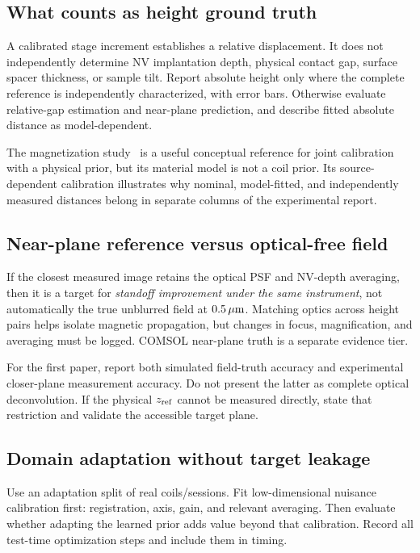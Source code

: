 \subsection{What counts as height ground truth}
A calibrated stage increment establishes a relative displacement. It does not independently determine NV implantation depth, physical contact gap, surface spacer thickness, or sample tilt. Report absolute height only where the complete reference is independently characterized, with error bars. Otherwise evaluate relative-gap estimation and near-plane prediction, and describe fitted absolute distance as model-dependent.

The magnetization study~\cite{setescak} is a useful conceptual reference for joint calibration with a physical prior, but its material model is not a coil prior. Its source-dependent calibration illustrates why nominal, model-fitted, and independently measured distances belong in separate columns of the experimental report.

\subsection{Near-plane reference versus optical-free field}
If the closest measured image retains the optical PSF and NV-depth averaging, then it is a target for \emph{standoff improvement under the same instrument}, not automatically the true unblurred field at $0.5\,\mu\mathrm m$. Matching optics across height pairs helps isolate magnetic propagation, but changes in focus, magnification, and averaging must be logged. COMSOL near-plane truth is a separate evidence tier.

For the first paper, report both simulated field-truth accuracy and experimental closer-plane measurement accuracy. Do not present the latter as complete optical deconvolution. If the physical $z_{\rm ref}$ cannot be measured directly, state that restriction and validate the accessible target plane.

\subsection{Domain adaptation without target leakage}
Use an adaptation split of real coils/sessions. Fit low-dimensional nuisance calibration first: registration, axis, gain, and relevant averaging. Then evaluate whether adapting the learned prior adds value beyond that calibration. Record all test-time optimization steps and include them in timing.

